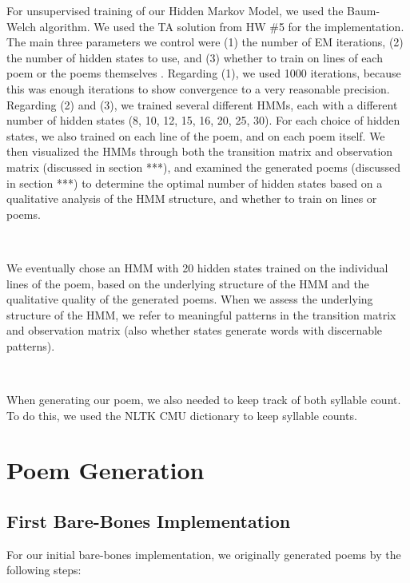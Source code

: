 For unsupervised training of our Hidden Markov Model, we used the Baum-Welch algorithm. We used the TA solution from HW \#5 for the implementation. The main three parameters we control were (1) the number of EM iterations, (2) the number of hidden states to use, and (3) whether to train on lines of each poem or the poems themselves  . Regarding (1), we used 1000 iterations, because this was enough iterations to show convergence to a very reasonable precision. Regarding (2) and (3), we trained several different HMMs, each with a different number of hidden states (8, 10, 12, 15, 16, 20, 25, 30). For each choice of hidden states, we also trained on each line of the poem, and on each poem itself. We then visualized the HMMs through both the transition matrix and observation matrix  (discussed in section ***), and examined the generated poems (discussed in section ***) to determine the optimal number of hidden states based on a qualitative analysis of the HMM structure, and whether to train on lines or poems.

~

We eventually chose an HMM with 20 hidden states trained on the individual lines of the poem, based on the underlying structure of the HMM and the qualitative quality of the generated poems. When we assess the underlying structure of the HMM, we refer to meaningful patterns in the transition matrix and observation matrix (also whether states generate words with discernable patterns).

~

When generating our poem, we also needed to keep track of both syllable count. To do this, we used the NLTK CMU dictionary to keep syllable counts.


\medskip

\section*{Poem Generation}

\subsection*{First Bare-Bones Implementation}

For our initial bare-bones implementation, we originally generated poems by the following steps:

~

